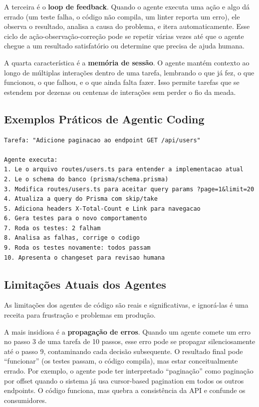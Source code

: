 A terceira é o \textbf{loop de feedback}. Quando o agente executa uma ação e algo dá
errado (um teste falha, o código não compila, um linter reporta um erro), ele
observa o resultado, analisa a causa do problema, e itera automaticamente. Esse ciclo
de ação-observação-correção pode se repetir várias vezes até que o agente chegue a um
resultado satisfatório ou determine que precisa de ajuda humana.

A quarta característica é a \textbf{memória de sessão}. O agente mantém contexto ao
longo de múltiplas interações dentro de uma tarefa, lembrando o que já fez, o que
funcionou, o que falhou, e o que ainda falta fazer. Isso permite tarefas que se
estendem por dezenas ou centenas de interações sem perder o fio da meada.

\subsection{Exemplos Práticos de Agentic Coding}

\begin{lstlisting}[language={}, caption={Fluxo típico de um agente de código}]
Tarefa: "Adicione paginacao ao endpoint GET /api/users"

Agente executa:
1. Le o arquivo routes/users.ts para entender a implementacao atual
2. Le o schema do banco (prisma/schema.prisma)
3. Modifica routes/users.ts para aceitar query params ?page=1&limit=20
4. Atualiza a query do Prisma com skip/take
5. Adiciona headers X-Total-Count e Link para navegacao
6. Gera testes para o novo comportamento
7. Roda os testes: 2 falham
8. Analisa as falhas, corrige o codigo
9. Roda os testes novamente: todos passam
10. Apresenta o changeset para revisao humana
\end{lstlisting}

\subsection{Limitações Atuais dos Agentes}

As limitações dos agentes de código são reais e significativas, e ignorá-las é uma
receita para frustração e problemas em produção.

A mais insidiosa é a \textbf{propagação de erros}. Quando um agente comete um erro no
passo 3 de uma tarefa de 10 passos, esse erro pode se propagar silenciosamente até o
passo 9, contaminando cada decisão subsequente. O resultado final pode ``funcionar''
(os testes passam, o código compila), mas estar conceitualmente errado. Por exemplo,
o agente pode ter interpretado ``paginação'' como paginação por offset quando o sistema
já usa cursor-based pagination em todos os outros endpoints. O código funciona, mas
quebra a consistência da API e confunde os consumidores.

